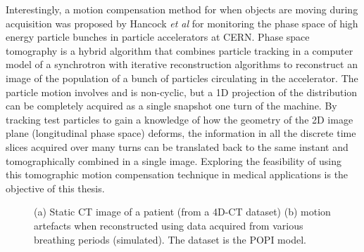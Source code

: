 Interestingly, a motion compensation method for when objects are moving during {acquisition} was proposed by Hancock \textit{et al}\cite{pst1}\cite{pst2}\cite{pstweb} for monitoring the phase space of high energy particle bunches in particle accelerators at CERN. Phase space tomography is a hybrid algorithm that combines particle tracking in a computer model of a synchrotron with iterative reconstruction algorithms to reconstruct an image of the population of a bunch of particles circulating in the accelerator. The particle motion involves  and is non-cyclic, but a 1D projection of the distribution can be completely acquired as a single snapshot  one turn of the machine. By tracking test particles to gain a knowledge of how the geometry of the 2D image plane (longitudinal phase space) deforms, the information in all the discrete time slices acquired over many turns can be translated back to the same instant and tomographically combined in a single image.  Exploring the feasibility of using this tomographic motion compensation technique in medical applications is the objective of this thesis.

\begin{figure}

\begin{center} 
 
\caption[Motion blurr in lung CBCT]{\label{fig:motionblurr}(a) Static CT image of a patient (from a 4D-CT dataset) (b) motion artefacts when reconstructed using data acquired from various breathing periods (simulated). The dataset is the POPI model\cite{popi-modelweb}.}
\end{center} 
\end{figure}


